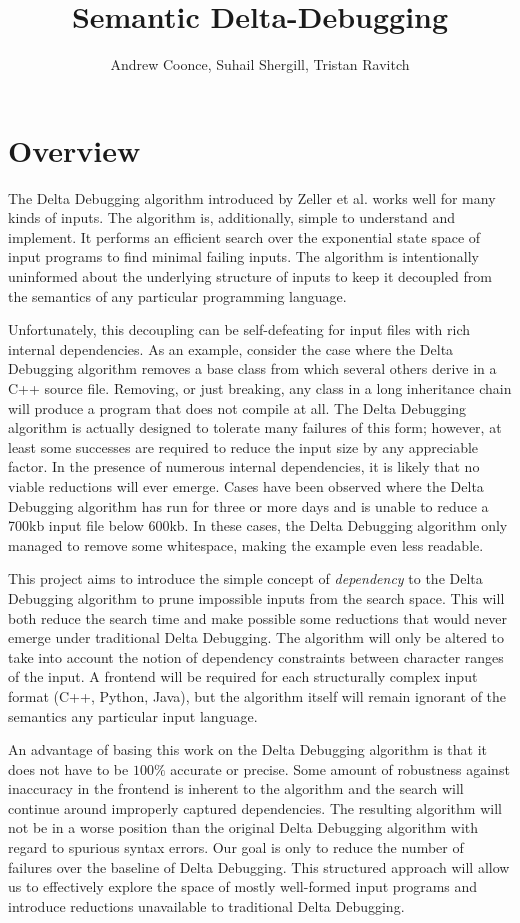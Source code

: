 \documentclass[11pt]{article}
\title{Semantic Delta-Debugging}
\author{
Andrew Coonce, Suhail Shergill, Tristan Ravitch\\
\email{\{coonce, shergill, travitch\}@cs.wisc.edu}
}
\begin{document}
\maketitle

\section{Overview}
The Delta Debugging algorithm introduced by Zeller et al. \cite{dd} works well
for many kinds of inputs. The algorithm is, additionally, simple to understand
and implement. It performs an efficient search over the exponential state space
of input programs to find minimal failing inputs. The algorithm is intentionally
uninformed about the underlying structure of inputs to keep it decoupled from
the semantics of any particular programming language.

Unfortunately, this decoupling can be self-defeating for input files with rich
internal dependencies. As an example, consider the case where the Delta
Debugging algorithm removes a base class from which several others derive in a
C++ source file. Removing, or just breaking, any class in a long inheritance
chain will produce a program that does not compile at all. The Delta Debugging
algorithm is actually designed to tolerate many failures of this form; however,
at least some successes are required to reduce the input size by any appreciable
factor. In the presence of numerous internal dependencies, it is likely that no
viable reductions will ever emerge. Cases have been observed where the Delta
Debugging algorithm has run for three or more days and is unable to reduce a
700kb input file below 600kb.  In these cases, the Delta Debugging algorithm
only managed to remove some whitespace, making the example even less readable.

This project aims to introduce the simple concept of \emph{dependency} to the
Delta Debugging algorithm to prune impossible inputs from the search space.
This will both reduce the search time and make possible some reductions that
would never emerge under traditional Delta Debugging. The algorithm will only be
altered to take into account the notion of dependency constraints between
character ranges of the input. A frontend will be required for each structurally
complex input format (C++, Python, Java), but the algorithm itself will remain
ignorant of the semantics any particular input language.

An advantage of basing this work on the Delta Debugging algorithm is that it
does not have to be $100 \%$ accurate or precise. Some amount of robustness
against inaccuracy in the frontend is inherent to the algorithm and the search
will continue around improperly captured dependencies.  The resulting algorithm
will not be in a worse position than the original Delta Debugging algorithm with
regard to spurious syntax errors.  Our goal is only to reduce the number of
failures over the baseline of Delta Debugging. This structured approach will
allow us to effectively explore the space of mostly well-formed input programs
and introduce reductions unavailable to traditional Delta Debugging.
\end{document}
